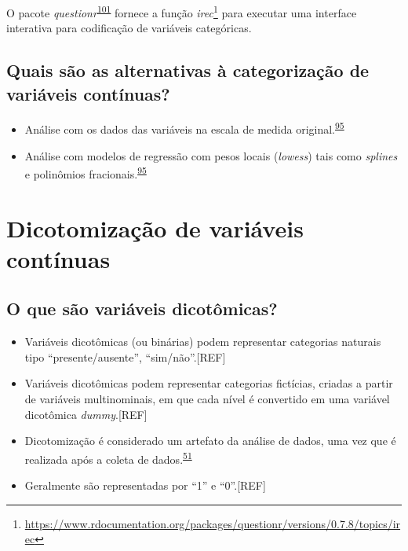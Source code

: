 \documentclass[
  a4paper,
]{book}
\renewcommand{\href}[2]{#2\footnote{\url{#1}}}
\newenvironment{infobox}[1]
  {
  \begin{itemize}
  \renewcommand{\labelitemi}{
    \raisebox{-.7\height}[0pt][0pt]{
      {\setkeys{Gin}{width=3em,keepaspectratio}
        \texttt{[image: \#1]}}
    }
  }
  \setlength{\fboxsep}{1em}
  \begin{blackbox}
  \item
  }
  {
  \end{blackbox}
  \end{itemize}
  }
\begin{document}
\begin{infobox}{images/Rlogo}
O pacote \emph{questionr}\textsuperscript{\protect\hyperlink{ref-questionr}{101}} fornece a função \href{https://www.rdocumentation.org/packages/questionr/versions/0.7.8/topics/irec}{\emph{irec}} para executar uma interface interativa para codificação de variáveis categóricas.

\end{infobox}

\hypertarget{quais-suxe3o-as-alternativas-uxe0-categorizauxe7uxe3o-de-variuxe1veis-contuxednuas}{%
\subsection{Quais são as alternativas à categorização de variáveis contínuas?}\label{quais-suxe3o-as-alternativas-uxe0-categorizauxe7uxe3o-de-variuxe1veis-contuxednuas}}

\begin{itemize}
\item
  Análise com os dados das variáveis na escala de medida original.\textsuperscript{\protect\hyperlink{ref-MacCallum2002}{95}}
\item
  Análise com modelos de regressão com pesos locais (\emph{lowess}) tais como \emph{splines} e polinômios fracionais.\textsuperscript{\protect\hyperlink{ref-MacCallum2002}{95}}
\end{itemize}

\hypertarget{dicotomizacao}{%
\section{Dicotomização de variáveis contínuas}\label{dicotomizacao}}

\hypertarget{o-que-suxe3o-variuxe1veis-dicotuxf4micas}{%
\subsection{O que são variáveis dicotômicas?}\label{o-que-suxe3o-variuxe1veis-dicotuxf4micas}}

\begin{itemize}
\item
  Variáveis dicotômicas (ou binárias) podem representar categorias naturais tipo ``presente/ausente'', ``sim/não''.{[}REF{]}
\item
  Variáveis dicotômicas podem representar categorias fictícias, criadas a partir de variáveis multinominais, em que cada nível é convertido em uma variável dicotômica \emph{dummy}.{[}REF{]}
\item
  Dicotomização é considerado um artefato da análise de dados, uma vez que é realizada após a coleta de dados.\textsuperscript{\protect\hyperlink{ref-aguinis2008}{51}}
\item
  Geralmente são representadas por ``1'' e ``0''.{[}REF{]}
\end{itemize}
\end{document}
